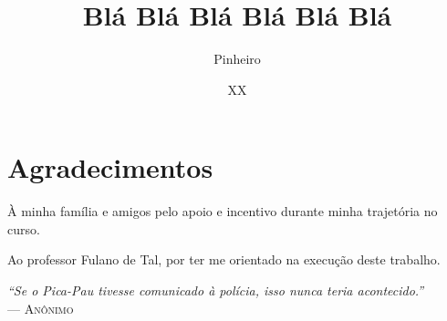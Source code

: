 \documentclass[tg]{mdtufsm}
\title{Blá Blá Blá Blá Blá Blá}
\author{Pinheiro}{Renan Birck}
\institute{Centro de Tecnologia}
\date{XX}{junho}{2015}
\begin{document}
\maketitle

\restoregeometry


\makeapprove


\chapter*{Agradecimentos}
À minha família e amigos pelo apoio e incentivo durante minha trajetória no curso.

Ao professor Fulano de Tal, por ter me orientado na execução deste trabalho.

\clearpage
\begin{flushright}
\mbox{}\vfill
{\sffamily\itshape
``Se o Pica-Pau tivesse comunicado à polícia, isso nunca teria acontecido.'' \\ }
--- \textsc{Anônimo}
\end{flushright}
\end{document}
